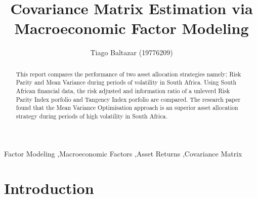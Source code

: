\documentclass[11pt,preprint, authoryear]{elsarticle}
\numberwithin{equation}{section}
\numberwithin{figure}{section}
\numberwithin{table}{section}
\begin{document}
\begin{frontmatter}  %

\title{Covariance Matrix Estimation via Macroeconomic Factor Modeling}





\author[Add1]{Tiago Baltazar (19776209)}





\address[Add1]{Stellenbosch University, Western Cape, South Africa}


\begin{abstract}
\small{
This report compares the performance of two asset allocation strategies
namely; Risk Parity and Mean Variance during periods of volatility in
South Africa. Using South African financial data, the risk adjusted and
information ratio of a unleverd Risk Parity Index porfolio and Tangency
Index porfolio are compared. The research paper found that the Mean
Variance Optimisation approach is an superior asset allocation strategy
during periods of high volatility in South Africa.
}
\end{abstract}

\vspace{1cm}


\begin{keyword}
\footnotesize{
Factor Modeling \sep Macroeconomic Factors \sep Asset Returns
\sep Covariance Matrix \\
\vspace{0.3cm}
}
\end{keyword}



\vspace{0.5cm}

\end{frontmatter}



\pagestyle{fancy}
\chead{}
\lfoot{}
\lhead{\leftmark}
\cfoot{}


\headsep 35pt %




\hypertarget{introduction}{%
\section{\texorpdfstring{Introduction
\label{Intro}}{Introduction }}\label{introduction}}
\end{document}
